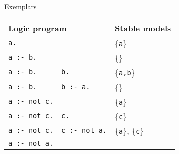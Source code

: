\begin{frame}[c]{Exemplars}
  \centering
  \begin{tabular}{|ll|l|}
    \hline
    \multicolumn{2}{|l|}{Logic program}         & Stable models\\
    \hline
    \hline
    \texttt{a.}          &                      & \{\texttt{a}\}\\
    \hline
    \texttt{a :- b.}     &                      & \{\}\\
    \hline
    \texttt{a :- b.}     & \texttt{b.}          & \{\texttt{a,b}\}\\
    \hline
    \texttt{a :- b.}     & \texttt{b :- a.}     & \{\}\\
    \hline
    \texttt{a :- not c.} &                      & \{\texttt{a}\}\\
    \hline
    \texttt{a :- not c.} & \texttt{c.}          & \{\texttt{c}\}\\
    \hline
    \texttt{a :- not c.} & \texttt{c :- not a.} & \{\texttt{a}\}, \{\texttt{c}\}\\
    \hline
    \texttt{a :- not a.} &                      & \\
    \hline
  \end{tabular}
\end{frame}
%
